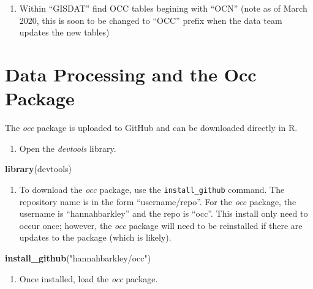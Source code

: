 \documentclass[]{book}
\newenvironment{Shaded}{\begin{snugshade}}{\end{snugshade}}
\newcommand{\KeywordTok}[1]{\textcolor[rgb]{0.13,0.29,0.53}{\textbf{#1}}}
\newcommand{\NormalTok}[1]{#1}
\newcommand{\StringTok}[1]{\textcolor[rgb]{0.31,0.60,0.02}{#1}}
\providecommand{\tightlist}{%
  \setlength{\itemsep}{0pt}\setlength{\parskip}{0pt}}
\begin{document}
\begin{enumerate}
\item
  Within ``GISDAT'' find OCC tables begining with ``OCN'' (note as of March 2020, this is soon to be changed to ``OCC'' prefix when the data team updates the new tables)
\end{enumerate}

\hypertarget{data_processing}{%
\chapter{Data Processing and the Occ Package}\label{data_processing}}

The \emph{occ} package is uploaded to GitHub and can be downloaded directly in R.

\begin{enumerate}
\def\labelenumi{\arabic{enumi}.}
\tightlist
\item
  Open the \emph{devtools} library.
\end{enumerate}

\begin{Shaded}
\begin{Highlighting}[]
\KeywordTok{library}\NormalTok{(devtools)}
\end{Highlighting}
\end{Shaded}

\begin{enumerate}
\def\labelenumi{\arabic{enumi}.}
\setcounter{enumi}{1}
\tightlist
\item
  To download the \emph{occ} package, use the \texttt{install\_github} command. The repository name is in the form ``username/repo''. For the \emph{occ} package, the username is ``hannahbarkley'' and the repo is ``occ''. This install only need to occur once; however, the \emph{occ} package will need to be reinstalled if there are updates to the package (which is likely).
\end{enumerate}

\begin{Shaded}
\begin{Highlighting}[]
\KeywordTok{install_github}\NormalTok{(}\StringTok{"hannahbarkley/occ"}\NormalTok{)}
\end{Highlighting}
\end{Shaded}

\begin{enumerate}
\def\labelenumi{\arabic{enumi}.}
\setcounter{enumi}{2}
\tightlist
\item
  Once installed, load the \emph{occ} package.
\end{enumerate}
\end{document}
